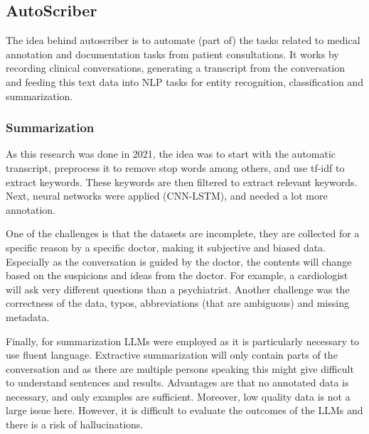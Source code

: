 \subsection{AutoScriber}

The idea behind autoscriber is to automate (part of) the tasks related
to medical annotation and documentation tasks from patient consultations.
It works by recording clinical conversations, generating a transcript from 
the conversation and feeding this text data into NLP tasks for entity recognition,
classification and summarization.

\subsubsection{Summarization}

As this research was done in 2021, the idea was to start with the automatic
transcript, preprocess it to remove stop words among others, and use tf-idf 
to extract keywords. These keywords are then filtered to extract relevant
keywords. Next, neural networks were applied (CNN-LSTM), and needed a lot 
more annotation.

One of the challenges is that the datasets are incomplete, they are collected
for a specific reason by a specific doctor, making it subjective and biased
data. Especially as the conversation is guided by the doctor, the contents will
change based on the suspicions and ideas from the doctor. For example, a cardiologist
will ask very different questions than a psychiatrist.
Another challenge was the correctness of the data, typos, abbreviations (that are ambiguous)
and missing metadata.

Finally, for summarization LLMs were employed as it is particularly necessary to
use fluent language. Extractive summarization will only contain parts of the conversation
and as there are multiple persons speaking this might give difficult to understand sentences
and results. Advantages are that no annotated data is necessary, and only examples are sufficient.
Moreover, low quality data is not a large issue here. However, it is difficult to evaluate the
outcomes of the LLMs and there is a risk of hallucinations.


